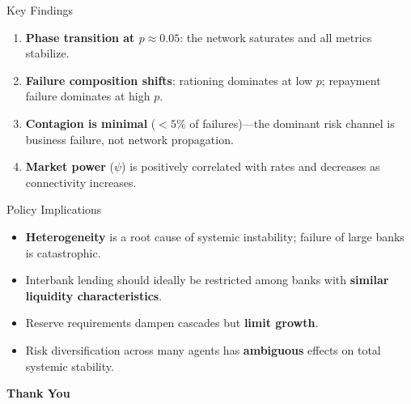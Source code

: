 \begin{frame}{Key Findings}
  \begin{enumerate}
    \item \textbf{Phase transition at $p \approx 0.05$}: the network saturates and all metrics stabilize.
    \item \textbf{Failure composition shifts}: rationing dominates at low $p$; repayment failure dominates at high $p$.
    \item \textbf{Contagion is minimal} ($<5\%$ of failures)---the dominant risk channel is business failure, not network propagation.
    \item \textbf{Market power} ($\psi$) is positively correlated with rates and decreases as connectivity increases.
  \end{enumerate}
\end{frame}

\begin{frame}{Policy Implications}
  \begin{itemize}
    \item \textbf{Heterogeneity} is a root cause of systemic instability; failure of large banks is catastrophic.
    \item Interbank lending should ideally be restricted among banks with \textbf{similar liquidity characteristics}.
    \item Reserve requirements dampen cascades but \textbf{limit growth}.
    \item Risk diversification across many agents has \textbf{ambiguous} effects on total systemic stability.
  \end{itemize}
\end{frame}

\begin{frame}
  \begin{center}
    \Large \textbf{Thank You}
  \end{center}
\end{frame}


